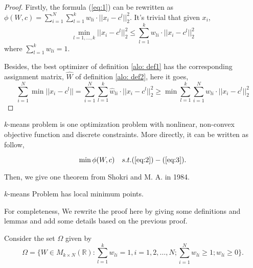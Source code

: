        \begin{theorem}
        \begin{proof}
        Firstly, the formula (\ref{eq:1}) can be rewritten as $\phi(W, c) = {\sum_{i=1}^{N}\sum_{l=1}^{k}} w_{li} \cdot ||x_{i} - c^{l}||^{2}_{2}$. It's trivial that given $x_{i}$,
        $$\min_{l = 1, \dots, k} ||x_{i} - c^{l}||_{2}^{2} \leq \sum_{l=1}^{k} w_{li} \cdot ||x_{i} - c^{l}||^{2}_{2}$$
         where $\sum_{l=1}^{k} w_{li} = 1$. 
         
         Besides, the best optimizer of definition \ref{alo: def1} has the corresponding assignment matrix, $\hat{W}$ of definition \ref{alo: def2}, here it goes,
         $$\sum_{i = 1}^{N}\min{||x_{i} - c^{l}||} = {\sum_{i=1}^{N}\sum_{l=1}^{k}} \hat{w}_{li} \cdot ||x_{i} - c^{l}||^{2}_{2}\geq \min{\sum_{l=1}^{k}\sum_{i=1}^{N}} w_{li} \cdot ||x_{i} - c^{l}||^{2}_{2}$$
        \end{proof}
        \end{theorem}
        \begin{remark}
        $k$-means problem is one optimization problem with nonlinear, non-convex objective function and discrete constraints. More directly, it can be written as follow,
        
        \begin{equation}
        \min \phi(W, c) \quad s.t. (\ref{eq:2})-(\ref{eq:3}).
        \end{equation}
        \end{remark}
    
      	Then, we give one theorem from Shokri and M. A. in 1984\cite{ref01}.

	\begin{theorem}{\label{alo:convergence}}
	$k$-means Problem has local minimum points.
	\end{theorem}

	For completeness, We rewrite the proof here by giving some definitions and lemmas and add some details based on the previous proof.

	\begin{definition}
	Consider the set $\Omega$ given by
	\begin{equation}
	\Omega = \{W \in M_{k\times N}(\mathbb{R}) : \sum_{l=1}^{k} w_{li} = 1, i = 1, 2, \dots, N; \sum_{i=1}^{N}w_{li}\geq 1; w_{li} \geq 0 \}.
	\end{equation}
	\end{definition}

